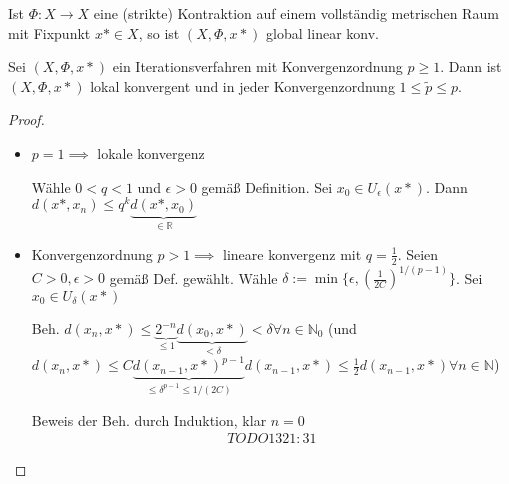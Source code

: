 \begin{example}
	Ist $\Phi: X \rightarrow X$ eine (strikte) Kontraktion auf einem vollständig metrischen Raum mit Fixpunkt $x* \in X$, so ist $(X, \Phi, x*)$ global linear konv.
\end{example}

\begin{lemma}
	Sei $(X, \Phi, x*)$ ein Iterationsverfahren mit Konvergenzordnung $p \geq 1$. Dann ist $(X, \Phi, x*)$ lokal konvergent und in jeder Konvergenzordnung $1 \leq \tilde{p} \leq p$.
\end{lemma}

\begin{proof}
	\begin{itemize}
		\item $p=1 \implies$ lokale konvergenz
		
		Wähle $0 < q < 1$ und $\epsilon > 0$ gemäß Definition. Sei $x_0 \in U_\epsilon(x*)$. Dann $d(x*, x_n) \leq q^k \underbrace{d(x*, x_0)}_{\in \mathbb{R}}$
		
		\item Konvergenzordnung $p > 1 \implies$ lineare konvergenz mit $q = \frac{1}{2}$. Seien $C>0, \epsilon>0$ gemäß Def. gewählt. Wähle $\delta := \min\{\epsilon, \left(\frac{1}{2C}\right)^{1/(p-1)}\}$. Sei $x_0 \in U_\delta(x*)$
		
		Beh. $d(x_n, x*) \leq \underbrace{2^{-n}}_{\leq 1} \underbrace{d(x_0, x*)}_{<\delta} < \delta \forall n \in \mathbb{N}_0$ (und $d(x_n, x*) \leq C \underbrace{d(x_{n-1}, x*)^{p-1}}_{\leq \delta^{p-1} \leq 1/(2C)} d(x_{n-1}, x*) \leq \frac{1}{2} d(x_{n-1}, x*) \forall n \in \mathbb{N}$)
		
		Beweis der Beh. durch Induktion, klar $n=0$
		\begin{align*}
			TODO 13 21:31
		\end{align*}
	\end{itemize}
\end{proof}




























